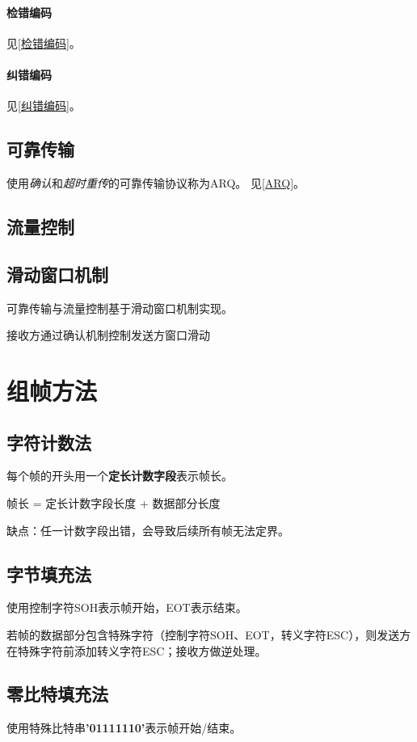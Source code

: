 \paragraph{检错编码}
见\ref{检错编码}。


\paragraph{纠错编码}
见\ref{纠错编码}。


\subsection{可靠传输}
使用\textit{确认}和\textit{超时重传}的可靠传输协议称为ARQ。
见\ref{ARQ}。

\subsection{流量控制}


\subsection{滑动窗口机制}
可靠传输与流量控制基于滑动窗口机制实现。

接收方通过确认机制控制发送方窗口滑动


\section{组帧方法}\label{组帧方法}

\subsection{字符计数法}
每个帧的开头用一个\textbf{定长计数字段}表示帧长。

帧长 = 定长计数字段长度 + 数据部分长度

缺点：任一计数字段出错，会导致后续所有帧无法定界。


\subsection{字节填充法}
使用控制字符SOH表示帧开始，EOT表示结束。

若帧的数据部分包含特殊字符（控制字符SOH、EOT，转义字符ESC），则发送方在特殊字符前添加转义字符ESC；接收方做逆处理。


\subsection{零比特填充法}
使用特殊比特串\textbf{'01111110'}表示帧开始/结束。

